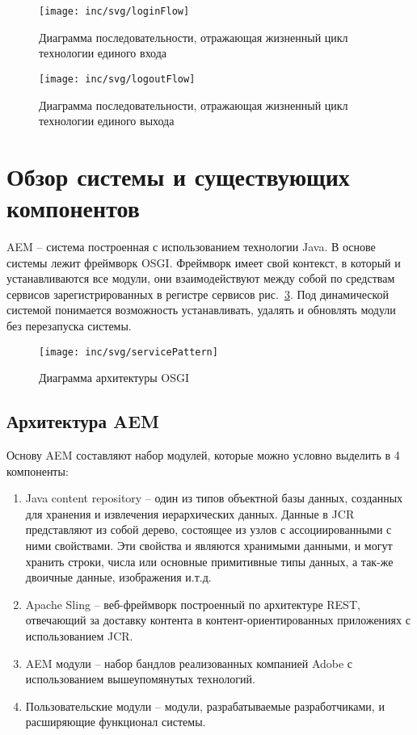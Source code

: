 \begin{figure}[h]
  \centering
  \texttt{[image: inc/svg/loginFlow]}
  \caption{Диаграмма последовательности, отражающая жизненный цикл технологии единого входа}
  \label{fig:loginFlow}
\end{figure}

\begin{figure}[h]
  \centering
  \texttt{[image: inc/svg/logoutFlow]}
  \caption{Диаграмма последовательности, отражающая жизненный цикл технологии единого выхода}
  \label{fig:logoutFlow}
\end{figure}

\section{Обзор системы и существующих компонентов}

AEM – система построенная с использованием технологии Java. В основе системы лежит фреймворк OSGI. Фреймворк имеет свой контекст, в который и устанавливаются все модули, они взаимодействуют между собой по средствам сервисов зарегистрированных в регистре сервисов рис.~\ref{fig:servicePattern}. Под динамической системой понимается возможность устанавливать, удалять и обновлять модули без перезапуска системы.

\begin{figure}[h]
  \centering
  \texttt{[image: inc/svg/servicePattern]}
  \caption{Диаграмма архитектуры OSGI}
  \label{fig:servicePattern}
\end{figure}

\subsection{Архитектура AEM}
Основу AEM составляют набор модулей, которые можно условно выделить в 4 компоненты:
\begin{enumerate}
\item Java content repository – один из типов объектной базы данных, созданных для хранения и извлечения иерархических данных. Данные в JCR представляют из собой дерево, состоящее из узлов с ассоциированными с ними свойствами. Эти свойства и являются хранимыми данными, и могут хранить строки, числа или основные примитивные типы данных, а так-же двоичные данные, изображения и.т.д. 
\item Apache Sling – веб-фреймворк построенный по архитектуре REST, отвечающий за доставку контента в контент-ориентированных приложениях с использованием JCR.
\item AEM модули – набор бандлов реализованных компанией Adobe с использованием вышеупомянутых технологий.
\item Пользовательские модули – модули, разрабатываемые разработчиками, и расширяющие функционал системы.
\end{enumerate}

